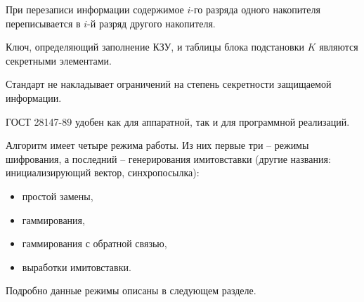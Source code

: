 При перезаписи информации содержимое $i$-го разряда одного накопителя переписывается в $i$-й разряд другого накопителя.

Ключ, определяющий заполнение КЗУ, и таблицы блока подстановки $K$ являются секретными элементами.

Стандарт не накладывает ограничений на степень секретности защищаемой информации.

ГОСТ 28147-89 удобен как для аппаратной, так и для программной реализаций.

Алгоритм имеет четыре режима работы. Из них первые три -- режимы шифрования, а последний -- генерирования имитовставки (другие названия: инициализирующий вектор, синхропосылка):
\begin{itemize}
    \item простой замены,
    \item гаммирования,
    \item гаммирования с обратной связью,
    \item выработки имитовставки.
\end{itemize}


Подробно данные режимы описаны в следующем разделе.

